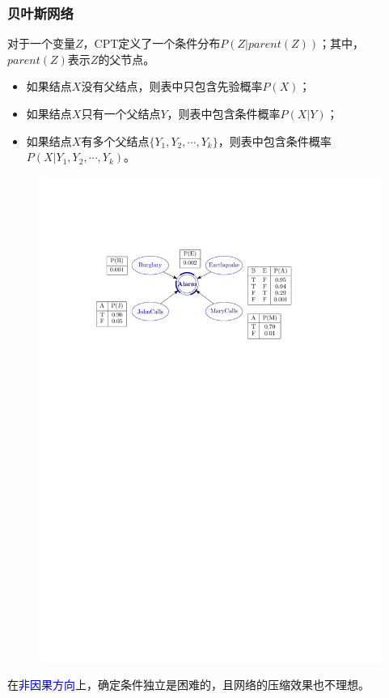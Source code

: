 \subsubsection{贝叶斯网络}
\begin{definition}
    对于一个变量$Z$，CPT定义了一个条件分布$P(Z|parent(Z))$；其中，$parent(Z)$表示$Z$的父节点。

    \begin{itemize}
        \item 如果结点$X$没有父结点，则表中只包含先验概率$P(X)$；
        \item 如果结点$X$只有一个父结点$Y$，则表中包含条件概率$P(X| Y)$；
        \item 如果结点$X$有多个父结点$\{Y_1,Y_2,\cdots,Y_k\}$，则表中包含条件概率$P(X|Y_1,Y_2,\cdots,Y_k)$。
    \end{itemize}
    \begin{figure}[htbp]
        \centering
        \includegraphics{image/CPT.pdf}
    \end{figure}
    在\textcolor{blue}{非因果方向}上，确定条件独立是困难的，且网络的压缩效果也不理想。
\end{definition}
